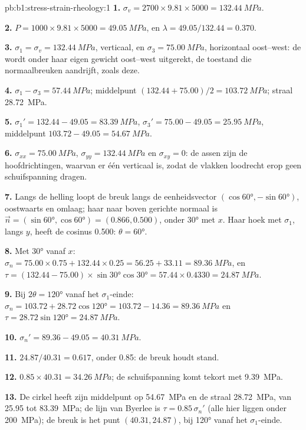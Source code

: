 \begin{solution}{pb:b1:stress-strain-rheology:1}
\textbf{1.} $\sigma_v = 2700\times9.81\times5000 = \qty{132.44}{MPa}$.

\textbf{2.} $P = 1000\times9.81\times5000 = \qty{49.05}{MPa}$, en
$\lambda = 49.05/132.44 = 0.370$.

\textbf{3.} $\sigma_1 = \sigma_v = \qty{132.44}{MPa}$, verticaal, en
$\sigma_3 = \qty{75.00}{MPa}$, horizontaal oost--west: de  wordt onder haar
eigen gewicht oost--west uitgerekt, de toestand die normaalbreuken aandrijft,
zoals deze.

\textbf{4.} $\sigma_1 - \sigma_3 = \qty{57.44}{MPa}$; middelpunt
$(132.44 + 75.00)/2 = \qty{103.72}{MPa}$; straal \qty{28.72}{MPa}.

\textbf{5.} $\sigma_1' = 132.44 - 49.05 = \qty{83.39}{MPa}$, $\sigma_3' =
75.00 - 49.05 = \qty{25.95}{MPa}$, middelpunt $103.72 - 49.05 = \qty{54.67}{MPa}$.

\textbf{6.} $\sigma_{xx} = \qty{75.00}{MPa}$, $\sigma_{yy} = \qty{132.44}{MPa}$
en $\sigma_{xy} = 0$: de assen zijn de hoofdrichtingen, waarvan er één verticaal
is, zodat de vlakken loodrecht erop geen schuifspanning dragen.

\textbf{7.} Langs de helling loopt de breuk langs de eenheidsvector
$(\cos\ang{60}, -\sin\ang{60})$, oostwaarts en omlaag; haar naar boven gerichte
normaal is $\vec n = (\sin\ang{60}, \cos\ang{60}) = (0.866, 0.500)$, onder
\ang{30} met $x$. Haar hoek met $\sigma_1$, langs $y$, heeft de cosinus
0.500: $\theta = \ang{60}$.

\textbf{8.} Met \ang{30} vanaf $x$: $\sigma_n = 75.00\times0.75 + 132.44\times0.25
= 56.25 + 33.11 = \qty{89.36}{MPa}$, en $\tau = (132.44 - 75.00)\times
\sin\ang{30}\cos\ang{30} = 57.44\times0.4330 = \qty{24.87}{MPa}$.

\textbf{9.} Bij $2\theta = \ang{120}$ vanaf het $\sigma_1$-einde:
$\sigma_n = 103.72 + 28.72\cos\ang{120} = 103.72 - 14.36 = \qty{89.36}{MPa}$
en $\tau = 28.72\sin\ang{120} = \qty{24.87}{MPa}$.

\textbf{10.} $\sigma_n' = 89.36 - 49.05 = \qty{40.31}{MPa}$.

\textbf{11.} $24.87/40.31 = 0.617$, onder 0.85: de breuk houdt stand.

\textbf{12.} $0.85\times40.31 = \qty{34.26}{MPa}$; de schuifspanning komt tekort
met \qty{9.39}{MPa}.

\textbf{13.} De cirkel heeft zijn middelpunt op \qty{54.67}{MPa} en de straal
\qty{28.72}{MPa}, van \num{25.95} tot \qty{83.39}{MPa}; de lijn van Byerlee is
$\tau = 0.85\,\sigma_n'$ (alle  hier liggen onder
\qty{200}{MPa}); de breuk is het punt $(40.31, 24.87)$, bij \ang{120} vanaf het
$\sigma_1$-einde.


\end{solution}
